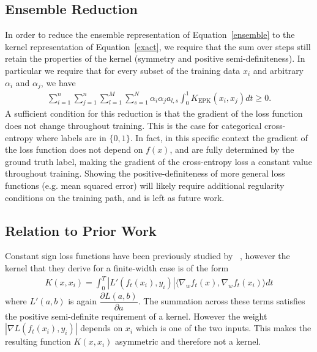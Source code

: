 \subsection{Ensemble Reduction}
In order to reduce the ensemble representation of Equation~\eqref{ensemble} to the kernel representation of Equation~\eqref{exact}, we require that the sum over steps still retain the properties of the kernel (symmetry and positive semi-definiteness). In particular we require that for every subset of the training data ${x_i}$ and arbitrary ${\alpha_i}$ and ${\alpha_j}$, we have
\begin{align}
    \sum_{i=1}^n\sum_{j=1}^n \sum_{l=1}^M \sum_{s=1}^N \alpha_i \alpha_j a_{l, s}\int_{0}^1 K_{\text{EPK}}(x_i,x_j) dt \geq 0.
\end{align}
A sufficient condition for this reduction is that the gradient of the loss function does not change throughout training. This is the case for categorical cross-entropy where labels are in $\{0,1\}$. In fact, in this specific context the gradient of the loss function does not depend on $f(x)$, and are fully determined by the ground truth label, making the gradient of the cross-entropy loss a constant value throughout training.
Showing the positive-definiteness of more general loss functions (e.g. mean squared error) will likely require additional regularity conditions on the training path, and is left as future work.

\subsection{Relation to Prior Work}
\label{subsec:disc}
Constant sign loss functions have been previously studied by ~\citet{chen2021equivalence}, however the kernel that they derive for a finite-width case is of the form
\begin{align}
    K(x,x_i) =  \int_0^T | L'(f_t(x_i), y_i)| \langle \nabla_w f_t(x), \nabla_w f_t(x_i) \rangle dt
\end{align}
where $L'(a, b)$ is again $\dfrac{\partial L(a, b)}{\partial a}$. 
The summation across these terms satisfies the positive semi-definite requirement of a kernel. However the weight $|\nabla L(f_t(x_i), y_i)|$ depends on $x_i$ which is one of the two inputs. This makes the resulting function $K(x,x_i)$ asymmetric and therefore not a kernel.

